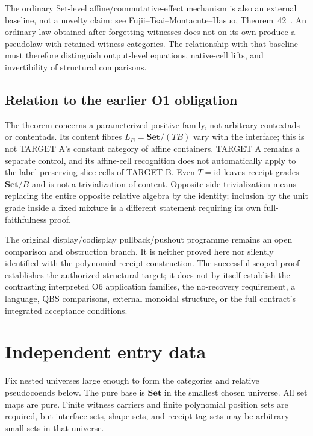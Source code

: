 \documentclass[11pt,a4paper]{article}
\theoremstyle{definition}
\newcommand{\Set}{\mathbf{Set}}
\newcommand{\id}{\mathrm{id}}
\begin{document}
The ordinary Set-level affine/commutative-effect mechanism is also an external
baseline, not a novelty claim: see Fujii--Tsai--Montacute--Hasuo,
Theorem~42~\cite{FTMH}. An ordinary law obtained after forgetting witnesses does
not on its own produce a pseudolaw with retained witness categories. The
relationship with that baseline must therefore distinguish output-level
equations, native-cell lifts, and invertibility of structural comparisons.

\subsection{Relation to the earlier O1 obligation}

The theorem concerns a parameterized positive family, not arbitrary
contextads or contentads. Its content fibres $L_B=\Set/(TB)$ vary with the
interface; this is not TARGET A's constant category of affine containers.
TARGET A remains a separate control, and its affine-cell recognition does not
automatically apply to the label-preserving slice cells of TARGET B.
Even $T=\id$ leaves receipt grades $\Set/B$ and is not a trivialization of
content. Opposite-side trivialization means replacing the entire opposite
relative algebra by the identity; inclusion by the unit grade inside a fixed
mixture is a different statement requiring its own full-faithfulness proof.

The original display/codisplay pullback/pushout programme remains an open
comparison and obstruction branch. It is neither proved here nor silently
identified with the polynomial receipt construction. The successful scoped
proof establishes the authorized structural target; it does not by itself
establish the contrasting interpreted O6 application
families, the no-recovery requirement, a language, QBS comparisons, external
monoidal structure, or the full contract's integrated acceptance conditions.

\section{Independent entry data}
\label{sec:inputs}

Fix nested universes large enough to form the categories and relative
pseudocoends below. The pure base is $\Set$ in the smallest chosen universe.
All set maps are pure. Finite witness carriers and finite polynomial position
sets are required, but interface sets, shape sets, and receipt-tag sets may be
arbitrary small sets in that universe.
\end{document}
